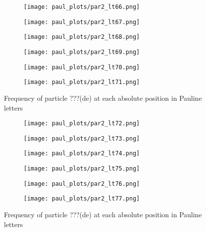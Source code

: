 \documentclass[a4paper]{article}
\begin{document}
\begin{figure}
\begin{subfigure}{0.45\textwidth}
\centering
\texttt{[image: paul\_plots/par2\_lt66.png]}
\end{subfigure}
\begin{subfigure}{0.45\textwidth}
\centering
\texttt{[image: paul\_plots/par2\_lt67.png]}
\end{subfigure}
\begin{subfigure}{0.45\textwidth}
\centering
\texttt{[image: paul\_plots/par2\_lt68.png]}
\end{subfigure}
\begin{subfigure}{0.45\textwidth}
\centering
\texttt{[image: paul\_plots/par2\_lt69.png]}
\end{subfigure}
\begin{subfigure}{0.45\textwidth}
\centering
\texttt{[image: paul\_plots/par2\_lt70.png]}
\end{subfigure}
\begin{subfigure}{0.45\textwidth}
\centering
\texttt{[image: paul\_plots/par2\_lt71.png]}
\end{subfigure}
\caption{Frequency of particle ???(de) at each absolute position in Pauline letters}
\label{paul_de}
\end{figure}

\begin{figure}
\ContinuedFloat
\begin{subfigure}{0.45\textwidth}
\centering
\texttt{[image: paul\_plots/par2\_lt72.png]}
\end{subfigure}
\begin{subfigure}{0.45\textwidth}
\centering
\texttt{[image: paul\_plots/par2\_lt73.png]}
\end{subfigure}
\begin{subfigure}{0.45\textwidth}
\centering
\texttt{[image: paul\_plots/par2\_lt74.png]}
\end{subfigure}
\begin{subfigure}{0.45\textwidth}
\centering
\texttt{[image: paul\_plots/par2\_lt75.png]}
\end{subfigure}
\begin{subfigure}{0.45\textwidth}
\centering
\texttt{[image: paul\_plots/par2\_lt76.png]}
\end{subfigure}
\begin{subfigure}{0.45\textwidth}
\centering
\texttt{[image: paul\_plots/par2\_lt77.png]}
\end{subfigure}
\caption{Frequency of particle ???(de) at each absolute position in Pauline letters}
\end{figure}
\end{document}
